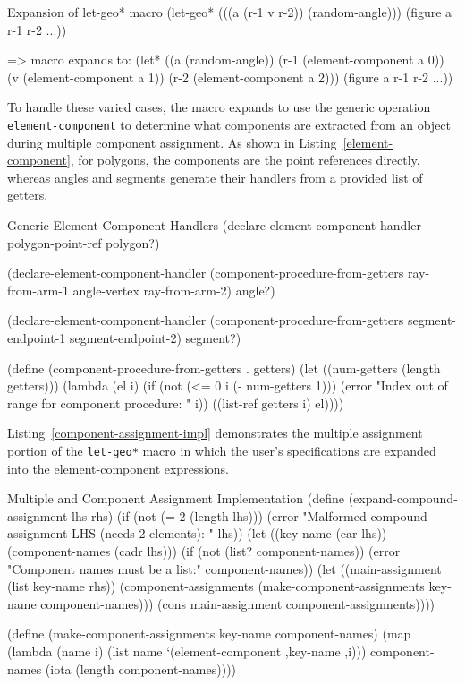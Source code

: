 \begin{repl-example}
[label=letgeo-expansion]
{Expansion of let-geo* macro}
(let-geo* (((a (r-1 v r-2)) (random-angle)))
  (figure a r-1 r-2 ...))

=> macro expands to:
(let* ((a (random-angle))
       (r-1 (element-component a 0))
       (v   (element-component a 1))
       (r-2 (element-component a 2)))
  (figure a r-1 r-2 ...))
\end{repl-example}

To handle these varied cases, the macro expands to use the generic
operation \texttt{element-component} to determine what components are
extracted from an object during multiple component assignment. As
shown in Listing~\ref{element-component}, for polygons, the components
are the point references directly, whereas angles and segments
generate their handlers from a provided list of getters.

\begin{code-listing}
[label=element-component]
{Generic Element Component Handlers}
(declare-element-component-handler polygon-point-ref polygon?)

(declare-element-component-handler
 (component-procedure-from-getters
   ray-from-arm-1 angle-vertex ray-from-arm-2)
 angle?)

(declare-element-component-handler
 (component-procedure-from-getters
   segment-endpoint-1 segment-endpoint-2)
 segment?)

(define (component-procedure-from-getters . getters)
  (let ((num-getters (length getters)))
    (lambda (el i)
      (if (not (<= 0 i (- num-getters 1)))
          (error "Index out of range for component procedure: " i))
      ((list-ref getters i) el))))
\end{code-listing}

Listing~\ref{component-assignment-impl} demonstrates the multiple
assignment portion of the \texttt{let-geo*} macro in which the user's
specifications are expanded into the element-component expressions.

\begin{code-listing}
[label=component-assignment-impl]
{Multiple and Component Assignment Implementation}
(define (expand-compound-assignment lhs rhs)
  (if (not (= 2 (length lhs)))
      (error "Malformed compound assignment LHS (needs 2 elements): " lhs))
  (let ((key-name (car lhs))
        (component-names (cadr lhs)))
    (if (not (list? component-names))
        (error "Component names must be a list:" component-names))
    (let ((main-assignment (list key-name rhs))
          (component-assignments
           (make-component-assignments key-name component-names)))
      (cons main-assignment
            component-assignments))))

(define (make-component-assignments key-name component-names)
  (map (lambda (name i)
         (list name `(element-component ,key-name ,i)))
       component-names
       (iota (length component-names))))
\end{code-listing}

